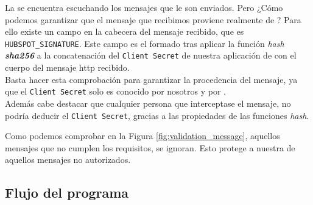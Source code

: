 La \iface{} se encuentra escuchando los mensajes que le son enviados. Pero ¿Cómo podemos garantizar que el mensaje que recibimos proviene realmente de \hs{}?
Para ello existe un campo en la cabecera del mensaje recibido, que es \texttt{HUBSPOT\_SIGNATURE}. 
Este campo es el formado tras aplicar la función \textit{hash \textbf{sha256}} a la concatenación del \texttt{Client Secret} de nuestra aplicación de \hs{} con el cuerpo del mensaje \acrshort{http} recibido.\\

Basta hacer esta comprobación para garantizar la procedencia del mensaje, ya que el \texttt{Client Secret} solo es conocido por nosotros y por \hs{}. \\

Además cabe destacar que cualquier persona que interceptase el mensaje, no podría deducir el \texttt{Client Secret}, gracias a las propiedades de las funciones \textit{hash}. 




Como podemos comprobar en la Figura \ref{fig:validation_message}, aquellos mensajes que no cumplen los requisitos, se ignoran. Esto protege a nuestra \iface{} de aquellos mensajes no autorizados.




\subsection{Flujo del programa}

